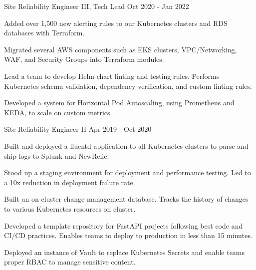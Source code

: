 \begin{cventries}
  \cventry
    {Site Reliability Engineer III, Tech Lead} %
    {} %
    {} %
    {Oct 2020 - Jan 2022} %
    {
      \begin{cvitems} %
        \item {Added over 1,500 new alerting rules to our Kubernetes clusters and RDS databases with Terraform.}
        \item {Migrated several AWS components such as EKS clusters, VPC/Networking, WAF, and Security Groups into Terraform modules.}
        \item {Lead a team to develop Helm chart linting and testing rules. Performs Kubernetes schema validation, dependency verification, and custom linting rules.}
        \item {Developed a system for Horizontal Pod Autoscaling, using Prometheus and KEDA, to scale on custom metrics.}
      \end{cvitems}
    }

  \cventry
    {Site Reliability Engineer II} %
    {} %
    {} %
    {Apr 2019 - Oct 2020} %
    {
      \begin{cvitems} %
        \item {Built and deployed a fluentd application to all Kubernetes clusters to parse and ship logs to Splunk and NewRelic.}
        \item {Stood up a staging environment for deployment and performance testing. Led to a 10x reduction in deployment failure rate.}
        \item {Built an on cluster change management database. Tracks the history of changes to various Kubernetes resources on cluster.}
        \item {Developed a template repository for FastAPI projects following best code and CI/CD practices. Enables teams to deploy to production in less than 15 minutes.}
        \item {Deployed an instance of Vault to replace Kubernetes Secrets and enable teams proper RBAC to manage sensitive content.}
      \end{cvitems}
    }



\end{cventries}

